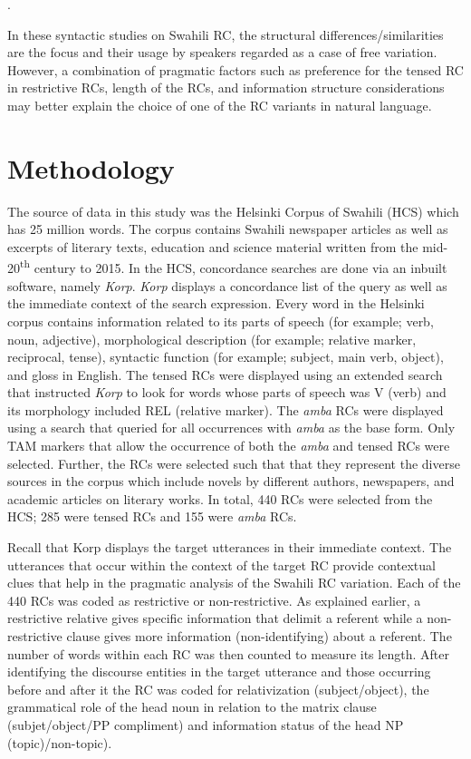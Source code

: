 \documentclass[output=paper,colorlinks,citecolor=brown]{langscibook}
\begin{document}
.

In these syntactic studies on Swahili RC, the structural differences/similarities are the focus and their usage by speakers regarded as a case of free variation. However, a combination of pragmatic factors such as preference for the tensed RC in restrictive RCs, length of the RCs, and information structure considerations may better explain the choice of one of the RC variants in natural language.

\section{Methodology}\label{sec:mwamzandi:3}

The source of data in this study was the Helsinki Corpus of Swahili (HCS) which has 25 million words. The corpus contains Swahili newspaper articles as well as excerpts of literary texts, education and science material written from the mid-20\textsuperscript{th} century to 2015. In the HCS, concordance searches are done via an inbuilt software, namely \textit{Korp}. \textit{Korp} displays a concordance list of the query as well as the immediate context of the search expression. Every word in the Helsinki corpus contains information related to its parts of speech (for example; verb, noun, adjective), morphological description (for example; relative marker, reciprocal, tense), syntactic function (for example; subject, main verb, object), and gloss in English. The tensed RCs were displayed using an extended search that instructed \textit{Korp} to look for words whose parts of speech was V (verb) and its morphology included REL (relative marker). The \textit{amba} RCs were displayed using a search that queried for all occurrences with \textit{amba} as the base form. Only TAM markers that allow the occurrence of both the \textit{amba} and tensed RCs were selected. Further, the RCs were selected such that that they represent the diverse sources in the corpus which include novels by different authors, newspapers, and academic articles on literary works. In total, 440 RCs were selected from the HCS; 285 were tensed RCs and 155 were \textit{amba} RCs.

Recall that Korp displays the target utterances in their immediate context. The utterances that occur within the context of the target RC provide contextual clues that help in the pragmatic analysis of the Swahili RC variation. Each of the 440 RCs was coded as restrictive or non-restrictive. As explained earlier, a restrictive relative gives specific information that delimit a referent while a non-restrictive clause gives more information (non-identifying) about a referent. The number of words within each RC was then counted to measure its length. After identifying the discourse entities in the target utterance and those occurring before and after it the RC was coded for relativization (subject/object), the grammatical role of the head noun in relation to the matrix clause (subjet/object/PP compliment) and information status of the head NP (topic)/non-topic).
\end{document}
